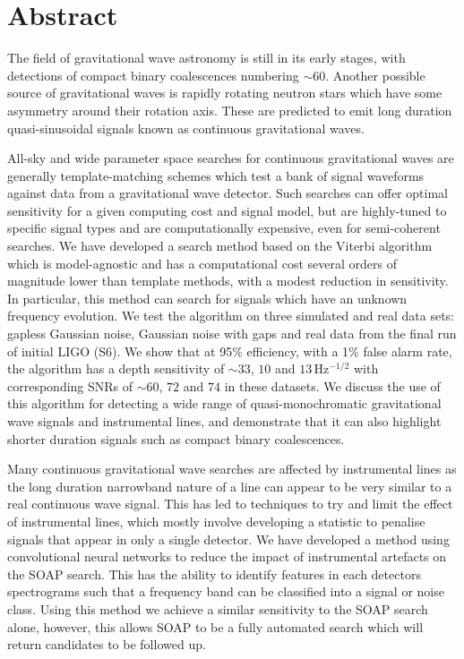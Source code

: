\chapter{Abstract}

The field of gravitational wave astronomy is still in its early stages, with detections of compact binary coalescences numbering $\sim 60$.
Another possible source of gravitational waves is rapidly rotating neutron stars which have some asymmetry around their rotation axis. These are predicted to emit long duration quasi-sinusoidal signals known as continuous gravitational waves.

All-sky and wide parameter space searches for continuous gravitational waves are generally template-matching schemes which test a bank of signal waveforms against data from a gravitational wave detector.  
Such searches can offer optimal sensitivity for a given computing cost and signal model, but are highly-tuned to specific signal types and are computationally expensive, even for semi-coherent searches. We have developed a search method based on the Viterbi algorithm which is model-agnostic and has a computational cost several orders of magnitude lower than template methods, with a modest reduction in sensitivity. In particular, this method can search for signals which have an unknown frequency evolution. We test the algorithm on three simulated and real data sets: gapless Gaussian noise, Gaussian noise with gaps and real data from the final run of initial LIGO (S6). We show that at 95\% efficiency, with a 1\% false alarm rate, the algorithm has a depth sensitivity of $\sim 33$, $10$ and $13$\,Hz$^{-1/2}$ with corresponding SNRs of $\sim 60$, $72$ and $74$ in these datasets. We discuss the use of this algorithm for detecting a wide range of quasi-monochromatic gravitational wave signals and instrumental lines, and demonstrate that it can also highlight shorter duration signals such as compact binary coalescences.


Many continuous gravitational wave searches are affected by instrumental lines as the long duration narrowband nature of a line can appear to be very similar to a real continuous wave signal. 
This has led to techniques to try and limit the effect of instrumental
lines, which mostly involve developing a statistic to penalise signals that
appear in only a single detector.  We have developed a method using
convolutional neural networks to reduce the impact of instrumental artefacts on
the SOAP search.  This has the ability to identify features in each detectors spectrograms such that a frequency band can be classified into a signal or
noise class.  Using this method we achieve a similar sensitivity to the SOAP search alone, however, this allows SOAP to be a fully automated search which will return candidates to be followed up.


